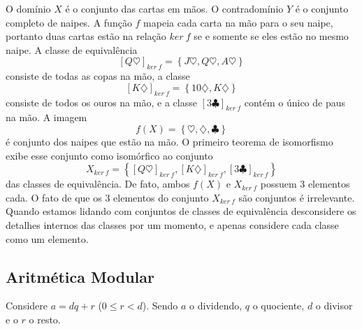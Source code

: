 O domínio $X$ é o conjunto das cartas em mãos. O contradomínio $Y$ é o conjunto completo de naipes. A função $f$ mapeia cada carta na mão para o seu naipe, portanto duas cartas estão na relação $ker\ f$ se e somente se eles estão no mesmo naipe. A classe de equivalência $$ \left[Q\heartsuit\right]_{ker\ f} = \left\{J\heartsuit , Q\heartsuit , A\heartsuit \right\}$$ consiste de todas as copas na mão, a classe $$\left[K\diamondsuit \right]_{ker\ f} = \left\{10\diamondsuit , K\diamondsuit \right\}$$ consiste de todos os ouros na mão, e a classe $\left[3\clubsuit \right]_{ker\ f}$ contém o único de paus na mão. A imagem $$f(X) = \left\{\heartsuit , \diamondsuit , \clubsuit  \right\}$$ é conjunto dos naipes que estão na mão. O primeiro teorema de isomorfismo exibe esse conjunto como isomórfico ao conjunto $$X_{ker\ f} = \left\{\left[Q\heartsuit\right]_{ker\ f}, \left[K\diamondsuit\right]_{ker\ f}, \left[3\clubsuit\right]_{ker\ f}\right\}$$ das classes de equivalência. De fato, ambos $f(X)$ e $X_{ker\ f}$ possuem 3 elementos cada. O fato de que os 3 elementos do conjunto $X_{ker\ f}$ são conjuntos é irrelevante. Quando estamos lidando com conjuntos de classes de equivalência desconsidere os detalhes internos das classes por um momento, e apenas considere cada classe como um elemento.

\subsection{Aritmética Modular}
Considere $a = dq + r$ ($0 \leq r < d$). Sendo $a$ o dividendo, $q$ o quociente, $d$ o divisor e o $r$ o resto.

